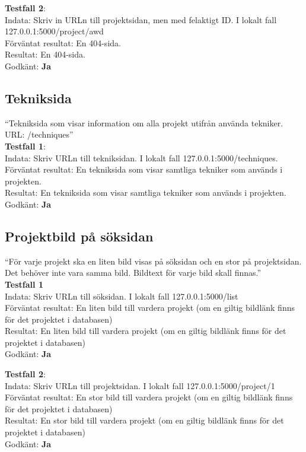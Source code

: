 \documentclass{TDP003mall}
\begin{document}
\textbf{Testfall 2}:\\
Indata: Skriv in URLn till projektsidan, men med felaktigt ID. I lokalt fall 127.0.0.1:5000/project/awd\\
Förväntat resultat: En 404-sida.\\
Resultat: En 404-sida.\\
Godkänt: \textbf{Ja}


\subsection{Tekniksida}
“Tekniksida som visar information om alla projekt utifrån använda tekniker.
URL: /techniques”\\
\textbf{Testfall 1}:\\
Indata: Skriv URLn till tekniksidan. I lokalt fall 127.0.0.1:5000/techniques.\\
Förväntat resultat: En tekniksida som visar samtliga tekniker som används i projekten.\\
Resultat: En tekniksida som visar samtliga tekniker som används i projekten.\\
Godkänt: \textbf{Ja}


\subsection{Projektbild på söksidan}
“För varje projekt ska en liten bild visas på söksidan och en stor på projektsidan. Det behöver inte vara samma bild. Bildtext för varje bild skall finnas.”\\
\textbf{Testfall 1}\\
Indata: Skriv URLn till söksidan. I lokalt fall 127.0.0.1:5000/list\\
Förväntat resultat: En liten bild till vardera projekt (om en giltig bildlänk finns för det projektet i databasen)\\
Resultat: En liten bild till vardera projekt (om en giltig bildlänk finns för det projektet i databasen)\\
Godkänt: \textbf{Ja}

\textbf{Testfall 2}:\\
Indata: Skriv URLn till projektsidan. I lokalt fall 127.0.0.1:5000/project/1\\
Förväntat resultat: En stor bild till vardera projekt (om en giltig bildlänk finns för det projektet i databasen)\\
Resultat: En stor bild till vardera projekt (om en giltig bildlänk finns för det projektet i databasen)\\
Godkänt: \textbf{Ja}
\end{document}
